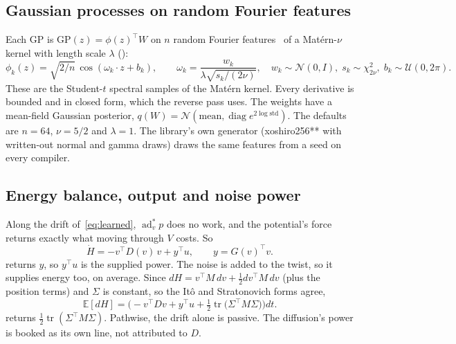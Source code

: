 \documentclass[11pt]{article}
\theoremstyle{remark}
\newcommand{\T}{^{\top}}
\begin{document}
\subsection{Gaussian processes on random Fourier features}
Each GP is $\mathrm{GP}(z)=\phi(z)\T W$ on $n$ random Fourier features~\cite{rahimi2007} of a
Mat\'ern-$\nu$ kernel with length scale $\lambda$ ():
\begin{equation}
  \phi_k(z)=\sqrt{2/n}\,\cos(\omega_k\cdot z+b_k),\qquad
  \omega_k=\frac{w_k}{\lambda\sqrt{s_k/(2\nu)}},\quad w_k\sim\mathcal N(0,I),\;s_k\sim\chi^2_{2\nu},\;
  b_k\sim\mathcal U(0,2\pi).
  \label{eq:rff}
\end{equation}
These are the Student-$t$ spectral samples of the Mat\'ern kernel. Every derivative is bounded and
in closed form, which the reverse pass uses. The weights have a mean-field Gaussian posterior,
$q(W)=\mathcal N(\text{mean},\operatorname{diag}e^{2\log\text{std}})$. The defaults are $n=64$,
$\nu=5/2$ and $\lambda=1$. The library's own generator (xoshiro256** with written-out normal and
gamma draws) draws the same features from a seed on every compiler.

\subsection{Energy balance, output and noise power}
\label{sec:learned-energy}
Along the drift of~\eqref{eq:learned}, $\operatorname{ad}^*_vp$ does no work, and the potential's
force returns exactly what moving through $V$ costs. So
\begin{equation}
  \dot H=-v\T D(v)\,v+y\T u,\qquad y=G(v)\T v .
  \label{eq:learned-balance}
\end{equation}
 returns $y$, so $y\T u$ is the supplied power. The noise is added to the twist,
so it supplies energy too, on average. Since $dH=v\T M\,dv+\tfrac12dv\T M\,dv$ (plus the position
terms) and $\Sigma$ is constant, so the It\^o and Stratonovich forms agree,
\begin{equation}
  \mathbb E[dH]=\Big(-v\T Dv+y\T u+\tfrac12\operatorname{tr}\big(\Sigma\T M\Sigma\big)\Big)dt .
  \label{eq:noise-power}
\end{equation}
 returns $\tfrac12\operatorname{tr}(\Sigma\T M\Sigma)$. Pathwise, the drift alone is
passive. The diffusion's power is booked as its own line, not attributed to $D$.
\end{document}

